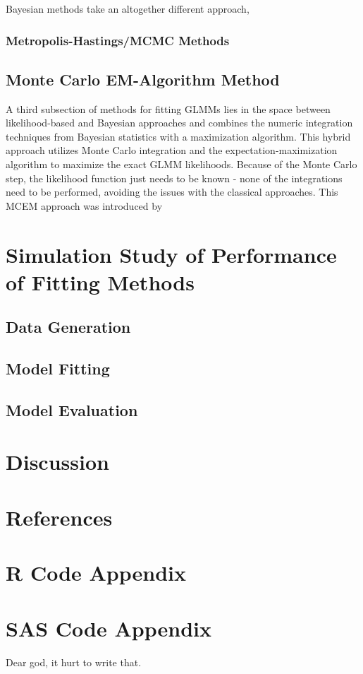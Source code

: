 \documentclass{article}\usepackage[]{graphicx}\usepackage[]{color}
\begin{document}
Bayesian methods take an altogether different approach, 

\subsubsection{Metropolis-Hastings/MCMC Methods}



\subsection{Monte Carlo EM-Algorithm Method}

A third subsection of methods for fitting GLMMs lies in the space between likelihood-based and Bayesian approaches and combines the numeric integration techniques from Bayesian statistics with a maximization algorithm. This hybrid approach utilizes Monte Carlo integration and the expectation-maximization algorithm to maximize the exact GLMM likelihoods. Because of the Monte Carlo step, the likelihood function just needs to be known - none of the integrations need to be performed, avoiding the issues with the classical approaches. This MCEM approach was introduced by 

\section{Simulation Study of Performance of Fitting Methods}



\subsection{Data Generation}



\subsection{Model Fitting}



\subsection{Model Evaluation}



\section{Discussion}



\section{References}



\newpage 

\section{R Code Appendix}


\section{SAS Code Appendix}

Dear god, it hurt to write that. 
\end{document}
